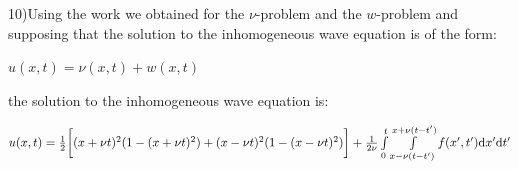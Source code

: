 \documentclass[executivepaper]{article}
\begin{document}
\begin{flushleft}

10)Using the work we obtained for the $\nu$-problem and the $w$-problem and supposing that the solution to the inhomogeneous wave equation is of the form:

\begin{center}

$u(x,t)=\nu(x,t)+w(x,t)$

\end{center}

the solution to the inhomogeneous wave equation is:

\pagebreak

\vspace*{-40mm}

\begin{center}

$u(x,t)=\frac{1}{2} \bigg[(x+\nu t)^2(1-(x+\nu t)^2)+(x-\nu t)^2(1-(x-\nu t)^2)\bigg]+\frac{1}{2\nu} \int\limits_{\vphantom{b}0}^{t}\int\limits_{x-\nu(t-t')}^{x+\nu(t-t')} f(x',t') \mathrm{d}x' \mathrm{d}t'$

\end{center}

\end{flushleft}
\end{document}

